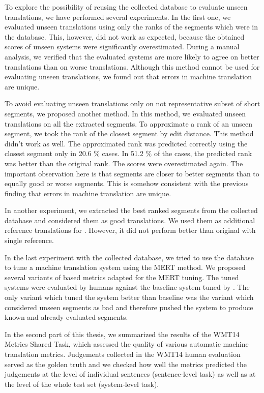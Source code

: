 To explore the possibility of reusing the collected database to evaluate unseen
translations, we have performed several experiments. In the first one, we
evaluated unseen translations using only the ranks of the segments which were
in the database.  This, however, did not work as expected, because the obtained
scores of unseen systems were significantly overestimated. During a manual
analysis, we verified that the evaluated systems are more likely to agree on
better translations than on worse translations. Although this method cannot be
used for evaluating unseen translations, we found out that errors in machine
translation are unique.

To avoid evaluating unseen translations only on not representative subset of
short segments, we proposed another method. In this method, we evaluated unseen
translations on all the extracted segments. To approximate a rank of an unseen
segment, we took the rank of the closest segment by edit distance. This method
didn't work as well.  The approximated rank was predicted correctly using the
closest segment only in 20.6 \% cases.  In 51.2 \% of the cases, the predicted
rank was better than the original rank. The scores were overestimated again.
The important observation here is that segments are closer to better segments
than to equally good or worse segments. This is somehow consistent with the
previous finding that errors in machine translation are unique.

In another experiment, we extracted the best ranked segments from the collected
database and considered them as good translations. We used them as additional
reference translations for . However, it did not perform better
than original  with single reference. 

In the last experiment with the collected database, we tried to use the
database to tune a machine translation system using the MERT method.  We
proposed several variants of  based metrics adapted for the
MERT tuning. The tuned systems were evaluated by humans against the baseline
system tuned by . The only variant which tuned the system better
than baseline was the variant which considered unseen segments as bad and
therefore pushed the system to produce known and already evaluated segments.


In the second part of this thesis, we summarized the results of the WMT14
Metrics Shared Task, which assessed the quality of various automatic machine
translation metrics. Judgements collected in the WMT14 human evaluation served
as the golden truth and we checked how well the metrics predicted the
judgements at the level of individual sentences (sentence-level task) as well
as at the level of the whole test set (system-level task).

